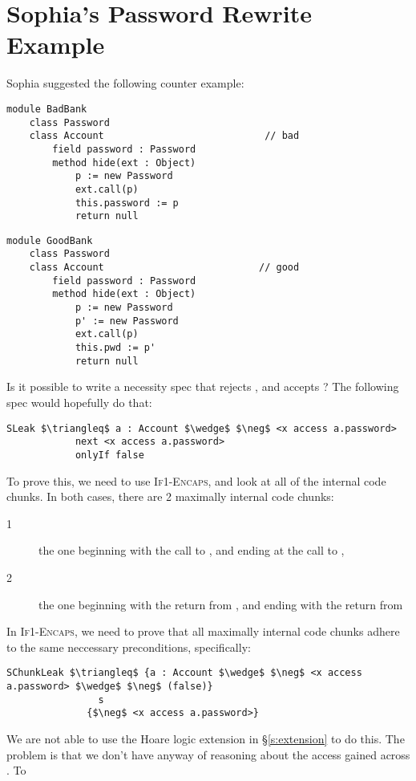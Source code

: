 \documentclass[11pt]{article} %
\theoremstyle{definition}
\begin{document}
\section{Sophia's Password Rewrite Example}
Sophia suggested the following counter example:
\begin{lstlisting}[language = Chainmail, mathescape=true, frame=lines]
module BadBank
	class Password
	class Account                            // bad
		field password : Password
		method hide(ext : Object)
			p := new Password
			ext.call(p)
			this.password := p
			return null
\end{lstlisting}
\begin{lstlisting}[language = Chainmail, mathescape=true, frame=lines]
module GoodBank
	class Password
	class Account                           // good
		field password : Password
		method hide(ext : Object)
			p := new Password
			p' := new Password
			ext.call(p)
			this.pwd := p'
			return null
\end{lstlisting}
Is it possible to write a necessity spec that rejects , and accepts ? The following spec would hopefully do that:
\begin{lstlisting}[language = Chainmail, frame = lines, mathescape = true]
SLeak $\triangleq$ a : Account $\wedge$ $\neg$ <x access a.password>
			next <x access a.password>
			onlyIf false
\end{lstlisting}
To prove this, we need to use \textsc{If1-Encaps}, and look at all of the internal code chunks. 
In both cases, there are 2 maximally internal code chunks:
\begin{description} 
\item[1] the one beginning with the call to , and ending at the call to ,
\item[2] the one beginning with the return from , and ending with the return from 
\end{description}
In \textsc{If1-Encaps}, we need to prove that all maximally internal code chunks adhere to the same neccessary preconditions, specifically:
\begin{lstlisting}[language = Chainmail, frame = lines, mathescape = true]
SChunkLeak $\triangleq$ {a : Account $\wedge$ $\neg$ <x access a.password> $\wedge$ $\neg$ (false)}
				s
	    	  {$\neg$ <x access a.password>}
\end{lstlisting}
We are not able to use the Hoare logic extension in \S \ref{s:extension} to do this. The problem is
that we don't have anyway of reasoning about the access gained across . To 
\end{document}
